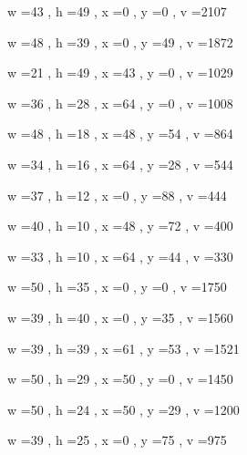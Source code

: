 \documentclass[11pt]{article}
\begin{document}
w =43 , h =49 , x =0 , y =0 , v =2107
\par
w =48 , h =39 , x =0 , y =49 , v =1872
\par
w =21 , h =49 , x =43 , y =0 , v =1029
\par
w =36 , h =28 , x =64 , y =0 , v =1008
\par
w =48 , h =18 , x =48 , y =54 , v =864
\par
w =34 , h =16 , x =64 , y =28 , v =544
\par
w =37 , h =12 , x =0 , y =88 , v =444
\par
w =40 , h =10 , x =48 , y =72 , v =400
\par
w =33 , h =10 , x =64 , y =44 , v =330
\par
\newpage




w =50 , h =35 , x =0 , y =0 , v =1750
\par
w =39 , h =40 , x =0 , y =35 , v =1560
\par
w =39 , h =39 , x =61 , y =53 , v =1521
\par
w =50 , h =29 , x =50 , y =0 , v =1450
\par
w =50 , h =24 , x =50 , y =29 , v =1200
\par
w =39 , h =25 , x =0 , y =75 , v =975
\par
\newpage
\end{document}
